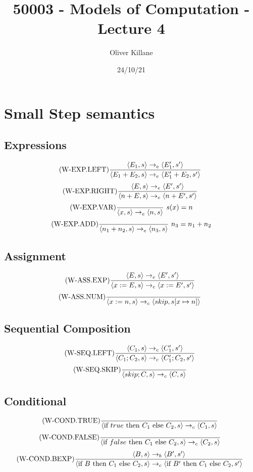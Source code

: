 \documentclass{report}
\title{50003 - Models of Computation - Lecture 4}
\author{Oliver Killane}
\date{24/10/21}
\begin{document}
    \maketitle  

    \section*{Small Step semantics}
        \subsection*{Expressions}
            \[\text{(W-EXP.LEFT)}\dfrac{
                \langle E_1, s \rangle \to_e \langle E_1', s' \rangle
                }{\langle E_1 + E_2, s \rangle \to_e \langle E_1' + E_2, s' \rangle} \ \]
            \[\text{(W-EXP.RIGHT)}\dfrac{
                \langle E, s \rangle \to_e \langle E', s' \rangle
                }{\langle n + E, s \rangle \to_e \langle n + E', s' \rangle} \ \]
            \[\text{(W-EXP.VAR)}\dfrac{}{\langle x, s \rangle \to_e \langle n, s \rangle} \ s(x) = n\]
            \[\text{(W-EXP.ADD)}\dfrac{}{\langle n_1 + n_2, s \rangle \to_e \langle n_3, s \rangle} \ n_3 = n_1 + n_2\]
        \subsection*{Assignment}
            \[\text{(W-ASS.EXP)}\dfrac{\langle E, s \rangle \to_e \langle E', s' \rangle}{
                \langle x := E, s \rangle \to_c \langle x := E', s' \rangle
            } \ \]
            \[\text{(W-ASS.NUM)}\dfrac{}{
                \langle x:= n, s \rangle \to_c \langle skip, s[x \mapsto n] \rangle
            } \ \]
        \subsection*{Sequential Composition}
            \[\text{(W-SEQ.LEFT)}\dfrac{\langle C_1, s \rangle \to_c \langle C_1', s' \rangle}{
                \langle C_1;C_2, s \rangle \to_c \langle C_1';C_2, s' \rangle
            } \ \]
            \[\text{(W-SEQ.SKIP)}\dfrac{}{
                \langle skip;C, s \rangle \to_c \langle C, s \rangle
            } \ \]
        \subsection*{Conditional}
            \[\text{(W-COND.TRUE)}\dfrac{}{\langle \text{if } true \text{ then } C_1 \text{ else } C_2, s \rangle \to_c \langle C_1, s \rangle} \ \]
            \[\text{(W-COND.FALSE)}\dfrac{}{\langle \text{if } false \text{ then } C_1 \text{ else } C_2, s \rangle \to_c \langle C_2, s \rangle} \ \]
            \[\text{(W-COND.BEXP)}\dfrac{
                \langle B, s \rangle \to_b \langle B', s' \rangle
            }{\langle \text{if } B \text{ then } C_1 \text{ else } C_2, s \rangle \to_c \langle \text{if } B' \text{ then } C_1 \text{ else } C_2, s' \rangle} \ \]
\end{document}
